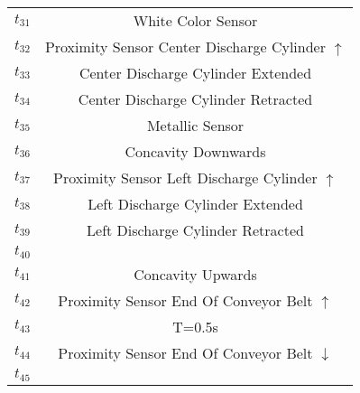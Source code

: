 \begin{table}[htbp]
\begin{tabular}{cc}
\hyperlink{partialNet:t31}{\hypertarget{partialTable:t31}{$t_{31}$}} & White Color Sensor\\
\hyperlink{partialNet:t32}{\hypertarget{partialTable:t32}{$t_{32}$}} & Proximity Sensor Center Discharge Cylinder \(\uparrow\)\\
\hyperlink{partialNet:t33}{\hypertarget{partialTable:t33}{$t_{33}$}} & Center Discharge Cylinder Extended\\
\hyperlink{partialNet:t34}{\hypertarget{partialTable:t34}{$t_{34}$}} & Center Discharge Cylinder Retracted\\
\hyperlink{partialNet:t35}{\hypertarget{partialTable:t35}{$t_{35}$}} & Metallic Sensor\\
\hyperlink{partialNet:t36}{\hypertarget{partialTable:t36}{$t_{36}$}} & Concavity Downwards\\
\hyperlink{partialNet:t37}{\hypertarget{partialTable:t37}{$t_{37}$}} & Proximity Sensor Left Discharge Cylinder \(\uparrow\)\\
\hyperlink{partialNet:t38}{\hypertarget{partialTable:t38}{$t_{38}$}} & Left Discharge Cylinder Extended\\
\hyperlink{partialNet:t39}{\hypertarget{partialTable:t39}{$t_{39}$}} & Left Discharge Cylinder Retracted\\
\hyperlink{partialNet:t40}{\hypertarget{partialTable:t40}{$t_{40}$}} & \\
\hyperlink{partialNet:t41}{\hypertarget{partialTable:t41}{$t_{41}$}} & Concavity Upwards\\
\hyperlink{partialNet:t42}{\hypertarget{partialTable:t42}{$t_{42}$}} & Proximity Sensor End Of Conveyor Belt \(\uparrow\)\\
\hyperlink{partialNet:tt43}{\hypertarget{partialTable:tt43}{$t_{43}$}} & T=0.5s\\
\hyperlink{partialNet:t44}{\hypertarget{partialTable:t44}{$t_{44}$}} & Proximity Sensor End Of Conveyor Belt \(\downarrow\)\\
\hyperlink{partialNet:t45}{\hypertarget{partialTable:t45}{$t_{45}$}} & \\
\end{tabular}
\end{table}
